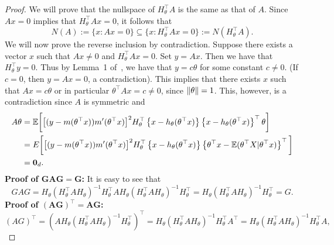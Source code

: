 \begin{proof}
We will prove that the nullspace of $H_\theta^\top A$ is the same as that of $A$. Since $Ax = 0 $ implies that $H_\theta^\top Ax = 0$, it follows
that
\[ N(A):=\{x : Ax = 0\} \subseteq \{x : H_\theta^\top Ax = 0\}:= N(H_\theta^\top A).\]
We will now prove the reverse inclusion by contradiction.   Suppose there exists a vector $x$ such that $Ax\neq 0$ and $H_\theta^\top Ax = 0.$ Set $y = Ax$.  Then we have that $H_\theta^\top y=0$. Thus by Lemma~1 of~\cite{Patra16}, we have that $y = c\theta$ for some constant $c\neq 0$. (If $c = 0$, then $y = Ax = 0$, a contradiction). This implies that there exists $x$ such that $Ax = c\theta$ or in particular $\theta^{\top}Ax = c\neq 0$, since $\left\lVert\theta\right\rVert = 1$. This, however, is a contradiction since $A$ is symmetric and
\begin{align}\label{eq:Atheta}
\begin{split}
 A\theta &= \mathbb{E}\bigg[ \big[(y-m(\theta^\top x)) m^\prime(\theta^\top x)\big]^2  H_\theta^\top \left\lbrace x - h_\theta(\theta^\top x)\right\rbrace\left\lbrace x - h_\theta(\theta^\top x)\right\rbrace^\top \theta\bigg]\\
&=E\bigg[ \big[(y-m(\theta^\top x)) m^\prime(\theta^\top x)\big]^2  H_\theta^\top \left\lbrace x - h_\theta(\theta^\top x)\right\rbrace\left\lbrace \theta^\top x - \mathbb{E}(\theta^\top X|\theta^\top x)\right\rbrace^\top \bigg]\\
&=\mathbf{0}_d.
\end{split}
\end{align}
\textbf{Proof of $\mathbf{GAG=G}$:} It is easy to see that 
\begin{equation}\label{eq:GAG}
 GAG = H_\theta(H_\theta^\top {A} H_\theta)^{-1} H_\theta^\top A H_\theta(H_\theta^\top {A} H_\theta)^{-1} H_\theta^\top= H_\theta(H_\theta^\top {A} H_\theta)^{-1} H_\theta^\top = G.
\end{equation}
\textbf{Proof of $\mathbf{(AG)^\top=AG}$:}
\begin{equation}\label{eq:GAtrans}
 (AG)^\top = (A H_\theta(H_\theta^\top {A} H_\theta)^{-1} H_\theta^\top)^\top = H_\theta(H_\theta^\top {A} H_\theta)^{-1} H_\theta^\top A^\top  =  H_\theta(H_\theta^\top {A} H_\theta)^{-1} H_\theta^\top A ,
\end{equation}

\end{proof}
